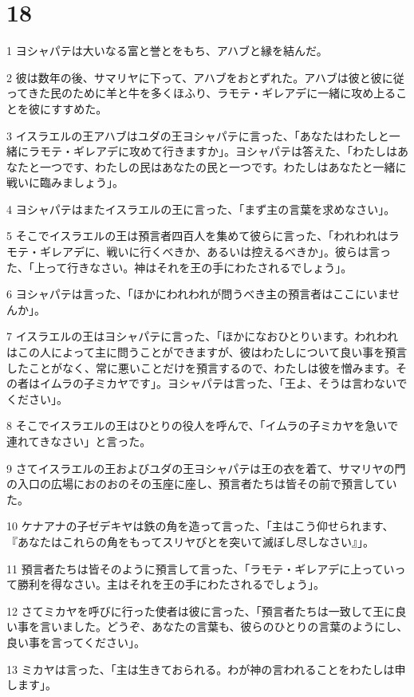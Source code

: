 \chapter{18}

\par 1 ヨシャパテは大いなる富と誉とをもち、アハブと縁を結んだ。
\par 2 彼は数年の後、サマリヤに下って、アハブをおとずれた。アハブは彼と彼に従ってきた民のために羊と牛を多くほふり、ラモテ・ギレアデに一緒に攻め上ることを彼にすすめた。
\par 3 イスラエルの王アハブはユダの王ヨシャパテに言った、「あなたはわたしと一緒にラモテ・ギレアデに攻めて行きますか」。ヨシャパテは答えた、「わたしはあなたと一つです、わたしの民はあなたの民と一つです。わたしはあなたと一緒に戦いに臨みましょう」。
\par 4 ヨシャパテはまたイスラエルの王に言った、「まず主の言葉を求めなさい」。
\par 5 そこでイスラエルの王は預言者四百人を集めて彼らに言った、「われわれはラモテ・ギレアデに、戦いに行くべきか、あるいは控えるべきか」。彼らは言った、「上って行きなさい。神はそれを王の手にわたされるでしょう」。
\par 6 ヨシャパテは言った、「ほかにわれわれが問うべき主の預言者はここにいませんか」。
\par 7 イスラエルの王はヨシャパテに言った、「ほかになおひとりいます。われわれはこの人によって主に問うことができますが、彼はわたしについて良い事を預言したことがなく、常に悪いことだけを預言するので、わたしは彼を憎みます。その者はイムラの子ミカヤです」。ヨシャパテは言った、「王よ、そうは言わないでください」。
\par 8 そこでイスラエルの王はひとりの役人を呼んで、「イムラの子ミカヤを急いで連れてきなさい」と言った。
\par 9 さてイスラエルの王およびユダの王ヨシャパテは王の衣を着て、サマリヤの門の入口の広場におのおのその玉座に座し、預言者たちは皆その前で預言していた。
\par 10 ケナアナの子ゼデキヤは鉄の角を造って言った、「主はこう仰せられます、『あなたはこれらの角をもってスリヤびとを突いて滅ぼし尽しなさい』」。
\par 11 預言者たちは皆そのように預言して言った、「ラモテ・ギレアデに上っていって勝利を得なさい。主はそれを王の手にわたされるでしょう」。
\par 12 さてミカヤを呼びに行った使者は彼に言った、「預言者たちは一致して王に良い事を言いました。どうぞ、あなたの言葉も、彼らのひとりの言葉のようにし、良い事を言ってください」。
\par 13 ミカヤは言った、「主は生きておられる。わが神の言われることをわたしは申します」。
